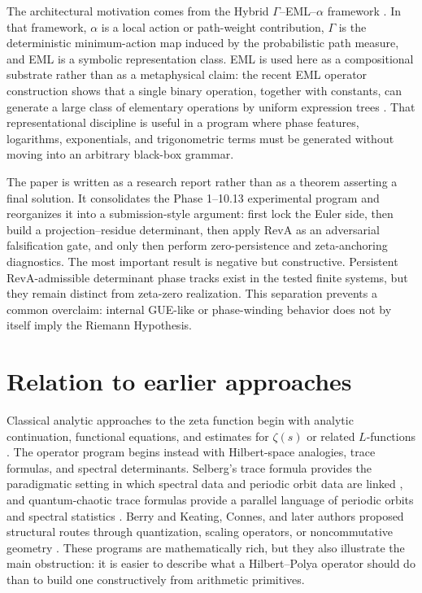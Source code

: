 \documentclass[11pt]{article}
\theoremstyle{definition}
\theoremstyle{plain}
\begin{document}
The architectural motivation comes from the Hybrid $\Gamma$--EML--$\alpha$ framework \citep{JoseHybridGammaEMLAlpha2026}.  In that framework, $\alpha$ is a local action or path-weight contribution, $\Gamma$ is the deterministic minimum-action map induced by the probabilistic path measure, and EML is a symbolic representation class.  EML is used here as a compositional substrate rather than as a metaphysical claim: the recent EML operator construction shows that a single binary operation, together with constants, can generate a large class of elementary operations by uniform expression trees \citep{Odrzywolek2026}.  That representational discipline is useful in a program where phase features, logarithms, exponentials, and trigonometric terms must be generated without moving into an arbitrary black-box grammar.

The paper is written as a research report rather than as a theorem asserting a final solution.  It consolidates the Phase 1--10.13 experimental program and reorganizes it into a submission-style argument: first lock the Euler side, then build a projection--residue determinant, then apply RevA as an adversarial falsification gate, and only then perform zero-persistence and zeta-anchoring diagnostics.  The most important result is negative but constructive.  Persistent RevA-admissible determinant phase tracks exist in the tested finite systems, but they remain distinct from zeta-zero realization.  This separation prevents a common overclaim: internal GUE-like or phase-winding behavior does not by itself imply the Riemann Hypothesis.

\section{Relation to earlier approaches}

Classical analytic approaches to the zeta function begin with analytic continuation, functional equations, and estimates for $\zeta(s)$ or related $L$-functions \citep{Edwards1974,Titchmarsh1986,Ivic1985}.  The operator program begins instead with Hilbert-space analogies, trace formulas, and spectral determinants.  Selberg's trace formula provides the paradigmatic setting in which spectral data and periodic orbit data are linked \citep{Selberg1956}, and quantum-chaotic trace formulas provide a parallel language of periodic orbits and spectral statistics \citep{Gutzwiller1990}.  Berry and Keating, Connes, and later authors proposed structural routes through quantization, scaling operators, or noncommutative geometry \citep{BerryKeating1999,Connes1999,Berry1985}.  These programs are mathematically rich, but they also illustrate the main obstruction: it is easier to describe what a Hilbert--Polya operator should do than to build one constructively from arithmetic primitives.
\end{document}
